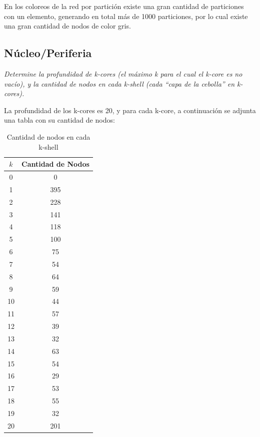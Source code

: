 \documentclass[12pt]{article}
\begin{document}
En los coloreos de la red por partición existe una gran cantidad de particiones con un elemento, generando en total más de 1000 particiones, por lo cual existe una gran cantidad de nodos de color gris.

\newpage

\subsection{Núcleo/Periferia}
\textit{Determine la profundidad de k-cores (el máximo k para el cual el k-core es no vacío), y la cantidad de nodos en cada k-shell (cada “capa de la cebolla” en k-cores).}

La profundidad de los k-cores es 20, y para cada k-core, a continuación se adjunta una tabla con su cantidad de nodos:

\begin{table}[H]
    \centering
    \begin{tabular}{|c|c|}
        \hline
        \textbf{\( k \)} & \textbf{Cantidad de Nodos} \\ \hline
        0  & 0   \\ \hline
        1  & 395 \\ \hline
        2  & 228 \\ \hline
        3  & 141 \\ \hline
        4  & 118 \\ \hline
        5  & 100 \\ \hline
        6  & 75  \\ \hline
        7  & 54  \\ \hline
        8  & 64  \\ \hline
        9  & 59  \\ \hline
        10 & 44  \\ \hline
        11 & 57  \\ \hline
        12 & 39  \\ \hline
        13 & 32  \\ \hline
        14 & 63  \\ \hline
        15 & 54  \\ \hline
        16 & 29  \\ \hline
        17 & 53  \\ \hline
        18 & 55  \\ \hline
        19 & 32  \\ \hline
        20 & 201 \\ \hline
    \end{tabular}
    \caption{Cantidad de nodos en cada k-shell}
    \label{tab:k_shells}
\end{table}
\end{document}
